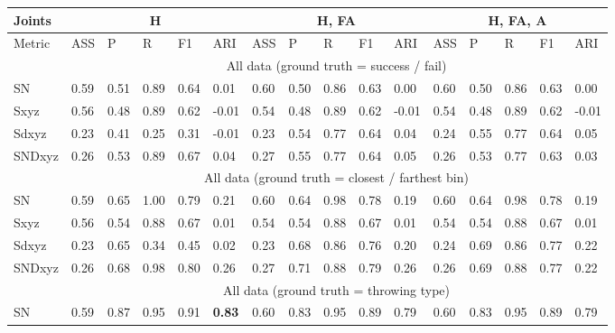 \begin{landscape}
\begin{table}[]
\centering
\begin{tabular}{|l|l|l|l|l|l|l|l|l|l|l|l|l|l|l|l|}
\hline
Joints & \multicolumn{5}{c|}{H}            & \multicolumn{5}{c|}{H, FA}        & \multicolumn{5}{c|}{H, FA, A}     \\ \hline
Metric & ASS  & P    & R    & F1   & ARI   & ASS  & P    & R    & F1   & ARI   & ASS  & P    & R    & F1   & ARI   \\ \hline
       & \multicolumn{15}{c|}{All data (ground truth = success / fail)}                                              \\ \hline
SN     & \cellcolor{green!25} 0.59 & 0.51 & 0.89 & 0.64 & 0.01  & 0.60 & 0.50 & 0.86 & 0.63 & 0.00  & 0.60 & 0.50 & 0.86 & 0.63 & 0.00  \\ \hline
Sxyz   & \cellcolor{green!25} 0.56 & 0.48 & 0.89 & 0.62 & -0.01 & 0.54 & 0.48 & 0.89 & 0.62 & -0.01 & 0.54 & 0.48 & 0.89 & 0.62 & -0.01 \\ \hline
Sdxyz  & 0.23 & 0.41 & 0.25 & 0.31 & -0.01 & 0.23 & 0.54 & 0.77 & 0.64 & 0.04  & 0.24 & 0.55 & 0.77 & 0.64 & 0.05  \\ \hline
SNDxyz & 0.26 & 0.53 & 0.89 & 0.67 & 0.04  & 0.27 & 0.55 & 0.77 & 0.64 & 0.05  & 0.26 & 0.53 & 0.77 & 0.63 & 0.03  \\ \hline
       & \multicolumn{15}{c|}{All data (ground truth = closest / farthest bin)}                                     \\ \hline
SN     & \cellcolor{green!25} 0.59 & 0.65 & 1.00 & 0.79 & 0.21  & 0.60 & 0.64 & 0.98 & 0.78 & 0.19  & 0.60 & 0.64 & 0.98 & 0.78 & 0.19  \\ \hline
Sxyz   & \cellcolor{green!25} 0.56 & 0.54 & 0.88 & 0.67 & 0.01  & 0.54 & 0.54 & 0.88 & 0.67 & 0.01  & 0.54 & 0.54 & 0.88 & 0.67 & 0.01  \\ \hline
Sdxyz  & 0.23 & 0.65 & 0.34 & 0.45 & 0.02  & 0.23 & 0.68 & 0.86 & 0.76 & 0.20  & 0.24 & 0.69 & 0.86 & 0.77 & 0.22  \\ \hline
SNDxyz & 0.26 & 0.68 & 0.98 & 0.80 & 0.26  & 0.27 & 0.71 & 0.88 & 0.79 & 0.26  & 0.26 & 0.69 & 0.88 & 0.77 & 0.22  \\ \hline
       & \multicolumn{15}{c|}{All data (ground truth = throwing type)}                                              \\ \hline
SN     & \cellcolor{green!25} 0.59 & 0.87 & 0.95 & 0.91 & \textbf{0.83}  & 0.60 & 0.83 & 0.95 & 0.89 & 0.79  & 0.60 & 0.83 & 0.95 & 0.89 & 0.79  \\ \hline

\end{tabular}
\end{table}
\end{landscape}
